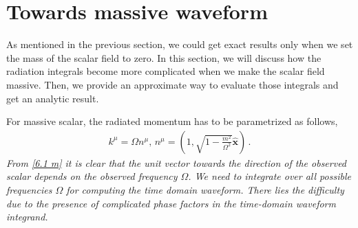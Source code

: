 \section{Towards massive waveform}\label{sec6}
As mentioned in the previous section, we could get exact results only when we set the mass of the scalar field to zero. In this section, we will discuss how the radiation integrals become more complicated when we make the scalar field massive. Then, we provide an approximate way to evaluate those integrals and get an analytic result. \par 
For massive scalar, the radiated momentum has to be parametrized as follows,
\begin{align}
    k^{\mu}=\Omega n^\mu,\, n^\mu=(1,\sqrt{1-\frac{m^2}{\Omega^2}}\boldsymbol{\hat{x}})\,.\label{6.1 m}
\end{align}
\textit{From \eqref{6.1 m} it is clear that the unit vector towards the direction of the observed scalar depends on the observed frequency $\Omega$. We need to integrate over all possible frequencies $\Omega$ for computing the time domain waveform. There lies the difficulty due to the presence of complicated phase factors in the time-domain waveform integrand. }
